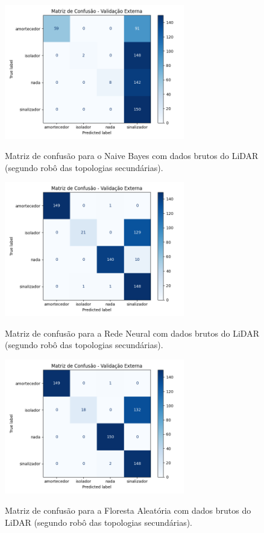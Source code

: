 \begin{figure}[H]
\centering
\caption{Matriz de confusão para o Naive Bayes com dados brutos do LiDAR (segundo robô das topologias secundárias).}
\includegraphics[width=0.7\textwidth]{figuras/Resultados/multi_segundo_Teste2_naive.png}
\label{fig:mc_lidar_naive_robo2_t2}
\fonte{}
\end{figure}

\begin{figure}[H]
\centering
\caption{Matriz de confusão para a Rede Neural com dados brutos do LiDAR (segundo robô das topologias secundárias).}
\includegraphics[width=0.7\textwidth]{figuras/Resultados/multi_segundo_Teste2_nn.png}
\label{fig:mc_lidar_nn_robo2_t2}
\fonte{}
\end{figure}

\begin{figure}[H]
\centering
\caption{Matriz de confusão para a Floresta Aleatória com dados brutos do LiDAR (segundo robô das topologias secundárias).}
\includegraphics[width=0.7\textwidth]{figuras/Resultados/multi_segundo_Teste2_rf.png}
\label{fig:mc_lidar_rf_robo2_t2}
\fonte{}
\end{figure}

